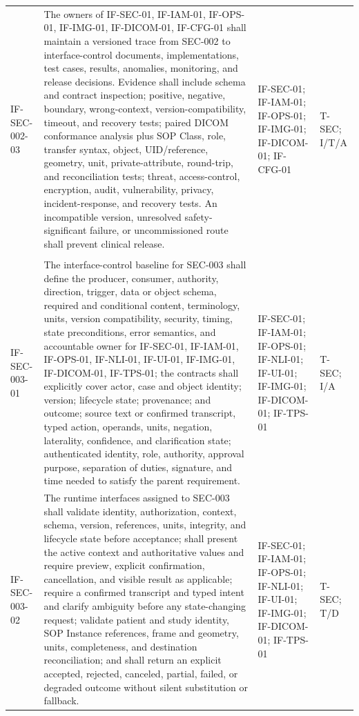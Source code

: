 \documentclass[11pt,letterpaper]{article}
\begin{document}
\begin{scriptsize}
\begin{longtable}{@{}L{0.14\textwidth}L{0.49\textwidth}L{0.19\textwidth}L{0.10\textwidth}@{}}
\addlinespace[2pt]
\mbox{IF-SEC-002-03} & The owners of IF-SEC-01, IF-IAM-01, IF-OPS-01, IF-IMG-01, IF-DICOM-01, IF-CFG-01 shall maintain a versioned trace from SEC-002 to interface-control documents, implementations, test cases, results, anomalies, monitoring, and release decisions. Evidence shall include schema and contract inspection; positive, negative, boundary, wrong-context, version-compatibility, timeout, and recovery tests; paired DICOM conformance analysis plus SOP Class, role, transfer syntax, object, UID\slash\allowbreak{}reference, geometry, unit, private-attribute, round-trip, and reconciliation tests; threat, access-control, encryption, audit, vulnerability, privacy, incident-response, and recovery tests. An incompatible version, unresolved safety-significant failure, or uncommissioned route shall prevent clinical release. & IF-SEC-01; IF-IAM-01; IF-OPS-01; IF-IMG-01; IF-DICOM-01; IF-CFG-01 & T-SEC; I\slash\allowbreak{}T\slash\allowbreak{}A \\
\addlinespace[2pt]
 \\
\addlinespace[2pt]
\mbox{IF-SEC-003-01} & The interface-control baseline for SEC-003 shall define the producer, consumer, authority, direction, trigger, data or object schema, required and conditional content, terminology, units, version compatibility, security, timing, state preconditions, error semantics, and accountable owner for IF-SEC-01, IF-IAM-01, IF-OPS-01, IF-NLI-01, IF-UI-01, IF-IMG-01, IF-DICOM-01, IF-TPS-01; the contracts shall explicitly cover actor, case and object identity; version; lifecycle state; provenance; and outcome; source text or confirmed transcript, typed action, operands, units, negation, laterality, confidence, and clarification state; authenticated identity, role, authority, approval purpose, separation of duties, signature, and time needed to satisfy the parent requirement. & IF-SEC-01; IF-IAM-01; IF-OPS-01; IF-NLI-01; IF-UI-01; IF-IMG-01; IF-DICOM-01; IF-TPS-01 & T-SEC; I\slash\allowbreak{}A \\
\addlinespace[2pt]
\mbox{IF-SEC-003-02} & The runtime interfaces assigned to SEC-003 shall validate identity, authorization, context, schema, version, references, units, integrity, and lifecycle state before acceptance; shall present the active context and authoritative values and require preview, explicit confirmation, cancellation, and visible result as applicable; require a confirmed transcript and typed intent and clarify ambiguity before any state-changing request; validate patient and study identity, SOP Instance references, frame and geometry, units, completeness, and destination reconciliation; and shall return an explicit accepted, rejected, canceled, partial, failed, or degraded outcome without silent substitution or fallback. & IF-SEC-01; IF-IAM-01; IF-OPS-01; IF-NLI-01; IF-UI-01; IF-IMG-01; IF-DICOM-01; IF-TPS-01 & T-SEC; T\slash\allowbreak{}D \\

\end{longtable}
\end{scriptsize}
\end{document}
